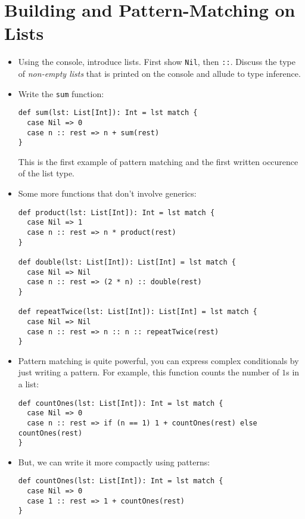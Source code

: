 \documentclass{book}
\begin{document}
\section{Building and Pattern-Matching on Lists}

\begin{itemize}

\item Using the console, introduce lists.
First show \verb|Nil|, then \verb|::|. Discuss the type of \emph{non-empty lists}
that is printed on the console and allude to type inference.

\item Write the \verb|sum| function:

\begin{verbatim}
def sum(lst: List[Int]): Int = lst match {
  case Nil => 0
  case n :: rest => n + sum(rest)
}
\end{verbatim}

This is the first example of pattern matching and the first written occurence of
the list type.

\item Some more functions that don't involve generics:
%
\begin{verbatim}
def product(lst: List[Int]): Int = lst match {
  case Nil => 1
  case n :: rest => n * product(rest)
}

def double(lst: List[Int]): List[Int] = lst match {
  case Nil => Nil
  case n :: rest => (2 * n) :: double(rest)
}

def repeatTwice(lst: List[Int]): List[Int] = lst match {
  case Nil => Nil
  case n :: rest => n :: n :: repeatTwice(rest)
}
\end{verbatim}

\item Pattern matching is quite powerful, you can express complex conditionals
by just writing a pattern. For example, this function counts the number of
$1$s in a list:
%
\begin{verbatim}
def countOnes(lst: List[Int]): Int = lst match {
  case Nil => 0
  case n :: rest => if (n == 1) 1 + countOnes(rest) else countOnes(rest)
}
\end{verbatim}

\item But, we can write it more compactly using patterns:
%
\begin{verbatim}
def countOnes(lst: List[Int]): Int = lst match {
  case Nil => 0
  case 1 :: rest => 1 + countOnes(rest)
}
\end{verbatim}


\end{itemize}
\end{document}
